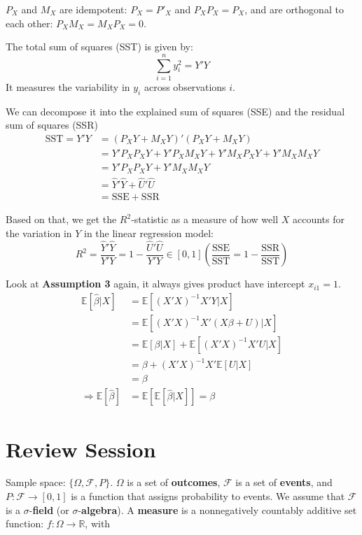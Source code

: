 \documentclass{article}
\begin{document}
$P_X$ and $M_X$ are idempotent: $P_X = P'_X$ and $P_X P_X = P_X$, and are orthogonal to each other: $P_X M_X = M_X P_X = 0$.

The total sum of squares (SST) is given by:
\[ \sum_{i = 1}^n y_i^2 = Y'Y \]
It measures the variability in $y_i$ across observations $i$.

We can decompose it into the explained sum of squares (SSE) and the residual sum of squares (SSR)
\begin{align*}
  \text{SST} = Y'Y &= (P_X Y + M_X Y)'(P_X Y + M_X Y)\\
  &= Y'P_X P_X Y + Y'P_X M_X Y + Y'M_X P_X Y + Y'M_X M_X Y \\
  &= Y'P_X P_X Y + Y'M_X M_X Y\\
  &= \hat{Y}'\hat{Y} + \hat{U}'\hat{U}\\
  &= \text{SSE} + \text{SSR}
\end{align*}

Based on that, we get the $R^2$-statistic as a measure of how well $X$ accounts for the variation in $Y$ in the linear regression model:
\[ R^2 = \frac{\hat{Y}'\hat{Y}}{Y'Y} = 1 - \frac{\hat{U}'\hat{U}}{Y'Y}
   \in [0, 1] \left(\frac{\text{SSE}}{\text{SST}} = 1 - \frac{\text{SSR}}{\text{SST}}\right) \]

Look at \textbf{Assumption 3} again, it always gives product have intercept $x_{i1} = 1$.
\begin{align*}
  \mathbb{E}[\hat{\beta} | X] &= \mathbb{E}[(X'X)^{-1}X'Y | X]\\
  &= \mathbb{E}[(X'X)^{-1}X'(X\beta + U) | X]\\
  &= \mathbb{E}[\beta | X] + \mathbb{E}[(X'X)^{-1}X'U | X]\\
  &= \beta + (X'X)^{-1}X'\mathbb{E}[U | X]\\
  &= \beta\\
  \Rightarrow \mathbb{E}[\hat{\beta}] &= \mathbb{E}[\mathbb{E}[\hat{\beta} | X]] = \beta
\end{align*}

\section*{Review Session}

Sample space: $\{\Omega, \mathcal{F}, P\}$. $\Omega$ is a set of \textbf{outcomes}, $\mathcal{F}$ is a set of \textbf{events}, and $P : \mathcal{F} \rightarrow [0, 1]$ is a function that assigns probability to events. We assume that $\mathcal{F}$ is a $\sigma$-\textbf{field} (or $\sigma$-\textbf{algebra}). A \textbf{measure} is a nonnegatively countably additive set function: $f : \Omega \rightarrow \mathbb{R}$, with
\end{document}
